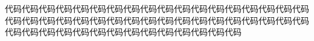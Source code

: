 \vspace*{12pt}
\centerline{\songti \textbf{}}
\vspace*{12pt}
代码代码代码代码代码代码代码代码代码代码代码代码代码代码代码代码代码代码代码代码代码代码代码代码代码代码代码代码代码代码代码代码代码代码代码代码代码代码代码代码代码代码代码代码代码代码代码代码代码代码




